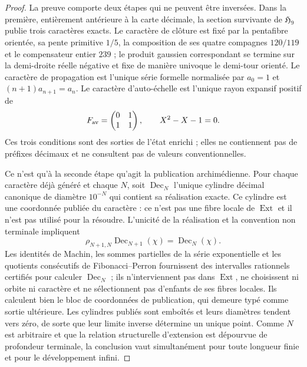 \begin{proof}
La preuve comporte deux étapes qui ne peuvent être inversées. Dans la première, entièrement
antérieure à la carte décimale, la section survivante de
\(\mathfrak H_9\) publie trois caractères exacts. Le caractère de clôture
est fixé par la pentafibre orientée, sa pente primitive \(1/5\), la
composition de ses quatre compagnes \(120/119\) et le compensateur entier
\(239\) ; le produit gaussien correspondant se termine sur la demi-droite
réelle négative et fixe de manière univoque le demi-tour orienté. Le caractère de
propagation est l'unique série formelle normalisée par
\(a_0=1\) et \((n+1)a_{n+1}=a_n\). Le caractère d'auto-échelle est l'unique rayon
expansif positif de
\[
 F_{\rm av}=\begin{pmatrix}0&1\\1&1\end{pmatrix},
 \qquad X^2-X-1=0.
\]
Ces trois conditions sont des sorties de l'état enrichi ; elles ne contiennent pas de
préfixes décimaux et ne consultent pas de valeurs conventionnelles.

Ce n'est qu'à la seconde étape qu'agit la publication archimédienne. Pour chaque caractère
déjà généré et chaque \(N\), soit \(\operatorname{Dec}_N\) l'unique cylindre
décimal canonique de diamètre \(10^{-N}\) qui contient sa réalisation exacte.
Ce cylindre est une coordonnée publiée du caractère : ce n'est pas une fibre locale
de \(\operatorname{Ext}\) et il n'est pas utilisé pour la résoudre.
L'unicité de la réalisation et la convention non terminale impliquent
\[
 \rho_{N+1,N}\operatorname{Dec}_{N+1}(\chi)
 =\operatorname{Dec}_N(\chi).
\]
Les identités de Machin, les sommes partielles de la série exponentielle et les
quotients consécutifs de Fibonacci--Perron fournissent des intervalles rationnels
certifiés pour calculer \(\operatorname{Dec}_N\) ; ils n'interviennent pas dans
\(\operatorname{Ext}\), ne choisissent ni orbite ni caractère et ne sélectionnent pas
d'enfants de ses fibres locales. Ils calculent bien le bloc de coordonnées de publication,
qui demeure typé comme sortie ultérieure. Les
cylindres publiés sont emboîtés et leurs diamètres tendent vers zéro, de sorte
que leur limite inverse détermine un unique point. Comme \(N\) est arbitraire et
que la relation structurelle d'extension est dépourvue de profondeur terminale, la
conclusion vaut simultanément pour toute longueur finie et pour le développement
infini.
\end{proof}

